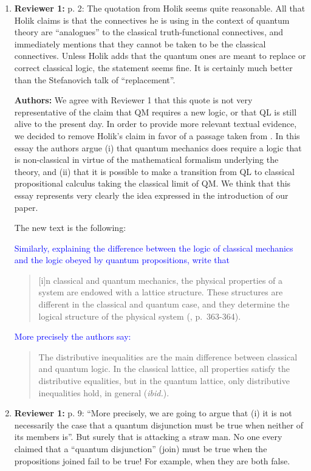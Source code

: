 \documentclass[11pt, executivepaper]{article}
\begin{document}
\begin{enumerate}
\item \textbf{Reviewer 1:} p. 2: The quotation from Holik seems quite reasonable. All that Holik claims is that the connectives he is using in the context of quantum theory are ``analogues'' to the classical truth-functional connectives, and immediately mentions that they cannot be taken to be the classical connectives. Unless Holik adds that the quantum ones are meant to replace or correct classical logic, the statement seems fine. It is certainly much better than the Stefanovich talk of ``replacement''.
\vspace{2mm}

\textbf{Authors:} We agree with Reviewer 1 that this quote is not very representative of the claim that QM requires a new logic, or that QL is still alive to the present day. In order to provide more relevant textual evidence, we decided to remove Holik's claim in favor of a passage taken from \cite{Holik:2019}. In this essay the authors argue (i) that quantum mechanics does require a logic that is non-classical in virtue of the mathematical formalism underlying the theory, and (ii) that it is possible to make a transition from QL to classical propositional calculus taking the classical limit of QM. We think that this essay represents very clearly the idea expressed in the introduction of our paper. 

The new text is the following:

\textcolor{blue}{Similarly, explaining the difference between the logic of classical mechanics and the logic obeyed by quantum propositions, \cite{Holik:2019} write that
\begin{quote}
[i]n classical and quantum mechanics, the physical properties of a system are endowed with a lattice structure. These structures are different in the classical
and quantum case, and they determine the logical structure of the physical system (\cite{Holik:2019}, p.\ 363-364).
\end{quote}
\noindent More precisely the authors say:
\begin{quote}
The distributive inequalities are the main difference between classical and quantum logic. In the classical lattice, all properties satisfy the distributive equalities, but in the quantum lattice, only distributive inequalities hold, in general (\emph{ibid.}).
\end{quote}
}

\item \textbf{Reviewer 1:} p. 9: ``More precisely, we are going to argue that (i) it is not necessarily the case that a quantum disjunction must be true when neither of its members is''. But surely that is attacking a straw man. No one every claimed that a ``quantum disjunction'' (join) must be true when the propositions joined fail to be true! For example, when they are both false.
\vspace{2mm}


\end{enumerate}
\end{document}
